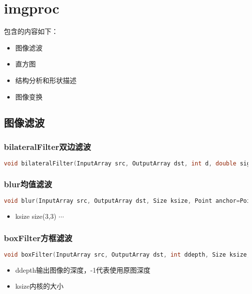 \documentclass[12pt]{article}
\begin{document}
\section{imgproc}
包含的内容如下：
\begin{itemize}
\item 图像滤波
\item 直方图
\item 结构分析和形状描述
\item 图像变换
\end{itemize}
\subsection{图像滤波}
\subsubsection{bilateralFilter双边滤波}
\begin{lstlisting}[language=c++]
void bilateralFilter(InputArray src, OutputArray dst, int d, double sigmaColor, double sigmaSpace, int borderType=BORDER_DEFAULT )
\end{lstlisting}

\subsubsection{blur均值滤波}
\begin{lstlisting}[language=c++]
void blur(InputArray src, OutputArray dst, Size ksize, Point anchor=Point(-1,-1), int borderType=BORDER_DEFAULT )
\end{lstlisting}
	\begin{itemize}
	\item ksize \quad size(3,3) $\cdots$
	\end{itemize}

\subsubsection{boxFilter方框滤波}
\begin{lstlisting}[language=c++]
void boxFilter(InputArray src, OutputArray dst, int ddepth, Size ksize, Point anchor=Point(-1,-1), bool normalize=true, int borderType=BORDER_DEFAULT )
\end{lstlisting}
	\begin{itemize}
	\item ddepth输出图像的深度，-1代表使用原图深度
	\item ksize内核的大小
	\end{itemize}
\end{document}
